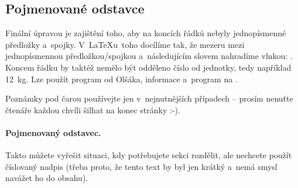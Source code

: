 \subsection{Pojmenované odstavce}

Finální úpravou je zajištění toho, aby na koncích řádků nebyly jednopísmenné předložky a~spojky. V~\LaTeX u~toho docílíme tak, že mezeru mezi jednopísmennou předložkou/spojkou a~následujícím slovem nahradíme vlnkou: \vlnka{}. Koncem řádku by taktéž nemělo být odděleno číslo od jednotky, tedy například 12~kg. Lze použít program  od Olšáka, informace a~program na \cite{vlnazdroj}.

Poznámky pod čarou používejte jen v~nejnutnějších případech -- prosím nenuťte čtenáře každou chvíli šilhat na konec stránky :-).

\paragraph{Pojmenovaný odstavec.} Takto můžete vyřešit situaci, kdy potřebujete sekci rozdělit, ale nechcete použít číslovaný nadpis (třeba proto, že tento text by byl jen krátký a~nemá smysl navážet ho do obsahu).
